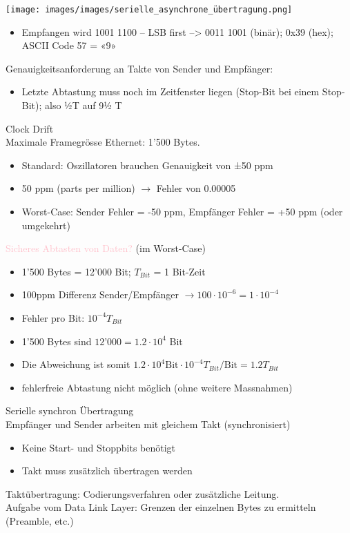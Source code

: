 \begin{example}
    \texttt{[image: images/images/serielle\_asynchrone\_übertragung.png]}
    \begin{itemize}
        \item Empfangen wird 1001 1100 – LSB first –> 0011 1001 (binär); 0x39 (hex); ASCII Code 57 = «9»
    \end{itemize}
    Genauigkeitsanforderung an Takte von Sender und Empfänger:
    \begin{itemize}
        \item Letzte Abtastung muss noch im Zeitfenster liegen (Stop-Bit bei einem Stop-Bit); also ½T auf 9½ T
    \end{itemize}
\end{example}

\begin{KR}{Clock Drift}\\
    Maximale Framegrösse Ethernet: 1’500 Bytes.
    \begin{itemize}
        \item Standard: Oszillatoren brauchen Genauigkeit von ±50 ppm 
        \item 50 ppm (parts per million) $\rightarrow$ Fehler von 0.00005
        \item Worst-Case: Sender Fehler = -50 ppm, Empfänger Fehler = +50 ppm (oder umgekehrt)
    \end{itemize}
    \textcolor{pink}{Sicheres Abtasten von Daten?} (im Worst-Case)
    \begin{itemize}
        \item 1'500 Bytes = 12'000 Bit; $T_{Bit}$ = 1 Bit-Zeit
        \item 100ppm Differenz Sender/Empfänger $\rightarrow 100 \cdot 10^{-6} = 1 \cdot 10^{-4}$
        \item Fehler pro Bit: $10^{-4} T_{Bit}$
        \item 1’500 Bytes sind $12’000 = 1.2 \cdot 10^4$ Bit
        \item Die Abweichung ist somit $1.2 \cdot 10^4 \text{Bit} \cdot 10^{-4} T_{Bit} / \text{Bit} = 1.2 T_{Bit}$
        \item fehlerfreie Abtastung nicht möglich (ohne weitere Massnahmen)
    \end{itemize}
\end{KR}

\begin{definition}{Serielle synchron Übertragung}\\
    Empfänger und Sender arbeiten mit gleichem Takt (synchronisiert)
    \begin{itemize}
        \item Keine Start- und Stoppbits benötigt
        \item Takt muss zusätzlich übertragen werden
    \end{itemize}
    Taktübertragung: Codierungsverfahren oder zusätzliche Leitung. \\
    Aufgabe vom Data Link Layer: Grenzen der einzelnen Bytes zu ermitteln (Preamble, etc.)
\end{definition}

